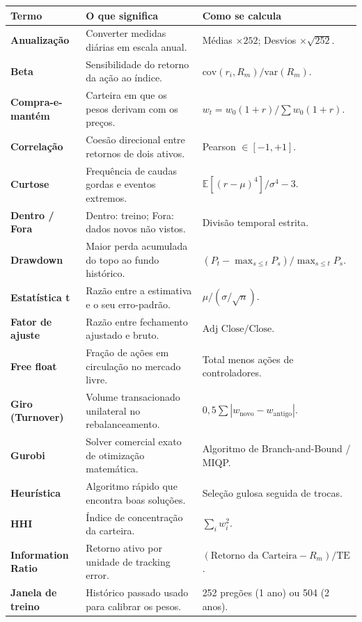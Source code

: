 \documentclass[11pt,a4paper]{article}
\begin{document}
\begin{longtable}{p{} p{} p{}}
\toprule
\textbf{Termo} & \textbf{O que significa} & \textbf{Como se calcula} \\
\midrule
\endhead
\textbf{Anualização} & Converter medidas diárias em escala anual. & Médias $\times 252$; Desvios $\times \sqrt{252}$. \\
\textbf{Beta} & Sensibilidade do retorno da ação ao índice. & $\text{cov}(r_i, R_m) / \text{var}(R_m)$. \\
\textbf{Compra-e-mantém} & Carteira em que os pesos derivam com os preços. & $w_{t} = w_0 (1+r) / \sum w_0(1+r)$. \\
\textbf{Correlação} & Coesão direcional entre retornos de dois ativos. & Pearson $\in [-1, +1]$. \\
\textbf{Curtose} & Frequência de caudas gordas e eventos extremos. & $\mathbb{E}[(r - \mu)^4] / \sigma^4 - 3$. \\
\textbf{Dentro / Fora} & Dentro: treino; Fora: dados novos não vistos. & Divisão temporal estrita. \\
\textbf{Drawdown} & Maior perda acumulada do topo ao fundo histórico. & $(P_t - \max_{s \le t} P_s) / \max_{s \le t} P_s$. \\
\textbf{Estatística t} & Razão entre a estimativa e o seu erro-padrão. & $\mu / (\sigma / \sqrt{n})$. \\
\textbf{Fator de ajuste} & Razão entre fechamento ajustado e bruto. & $\text{Adj Close} / \text{Close}$. \\
\textbf{Free float} & Fração de ações em circulação no mercado livre. & Total menos ações de controladores. \\
\textbf{Giro (Turnover)} & Volume transacionado unilateral no rebalanceamento. & $0,5 \sum |w_{\text{novo}} - w_{\text{antigo}}|$. \\
\textbf{Gurobi} & Solver comercial exato de otimização matemática. & Algoritmo de Branch-and-Bound / MIQP. \\
\textbf{Heurística} & Algoritmo rápido que encontra boas soluções. & Seleção gulosa seguida de trocas. \\
\textbf{HHI} & Índice de concentração da carteira. & $\sum_{i} w_i^2$. \\
\textbf{Information Ratio} & Retorno ativo por unidade de tracking error. & $(\text{Retorno da Carteira} - R_m) / \text{TE}$. \\
\textbf{Janela de treino} & Histórico passado usado para calibrar os pesos. & 252 pregões (1 ano) ou 504 (2 anos). \\

\end{longtable}
\end{document}
